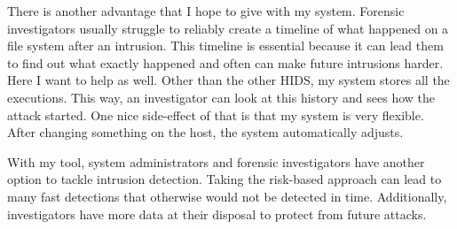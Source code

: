 There is another advantage that I hope to give with my system. Forensic investigators usually struggle to reliably create a timeline of what happened on a file system after an intrusion. This timeline is essential because it can lead them to find out what exactly happened and often can make future intrusions harder. Here I want to help as well. Other than the other HIDS, my system stores all the executions. This way, an investigator can look at this history and sees how the attack started. One nice side-effect of that is that my system is very flexible. After changing something on the host, the system automatically adjusts.

With my tool, system administrators and forensic investigators have another option to tackle intrusion detection. Taking the risk-based approach can lead to many fast detections that otherwise would not be detected in time. Additionally, investigators have more data at their disposal to protect from future attacks.